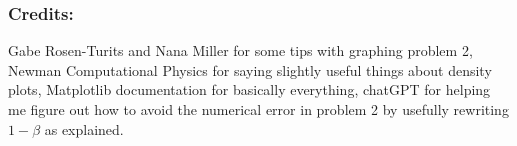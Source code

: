 \documentclass[11pt]{article}
\begin{document}
    \subsubsection{Credits:}\label{credits}

Gabe Rosen-Turits and Nana Miller for some tips with graphing problem 2,
Newman Computational Physics for saying slightly useful things about
density plots, Matplotlib documentation for basically everything,
chatGPT for helping me figure out how to avoid the numerical error in
problem 2 by usefully rewriting \(1-\beta\) as explained.


    
    
    
\end{document}
